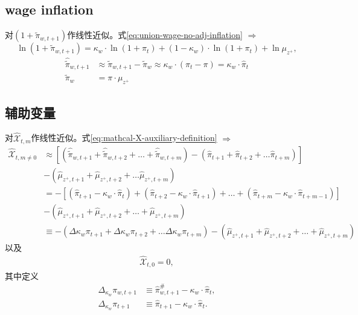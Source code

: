 \subsection{wage inflation}
\label{sec:union-wage-PC-wage-inflation}
对$\left( 1+\tilde{\pi}_{w,t+1} \right)$作线性近似。式\eqref{eq:union-wage-no-adj-inflation} $\Rightarrow$
\begin{equation*}
\ln (1+\tilde{\pi}_{w,t+1}) = \kappa_w \cdot \ln (1+\pi_t) + (1-\kappa_w) \cdot \ln (1+\pi_t) + \ln \mu_{z^+},
\end{equation*}
\begin{align}
\label{eq:union-max-wage-PC-lin-wage-inflation}
\hat{\tilde{\pi}}_{w,t+1} &\approx \tilde{\pi}_{w,t+1} - \tilde{\pi}_{w} \approx \kappa_w \cdot (\pi_t - \pi) = \kappa_w \cdot \hat{\pi}_t \\
\label{eq:union-max-wage-PC-ss-wage-inflation-pi-z}
\tilde{\pi}_{w} &= \pi \cdot \mu_{z^+}
\end{align}

\subsection{辅助变量}
\label{sec:union-wage-PC-wage-auxliary}
对$\hat{\mathcal{X}}_{t,m}$作线性近似。式\eqref{eq:mathcal-X-auxiliary-definition} $\Rightarrow$
\begin{align}
\label{eq:union-max-wage-PC-Xtm-n0}
\hat{\mathcal{X}}_{t,m \neq 0} &\approx   \left[\left(
  \hat{\tilde{\pi}}_{w,t+1} + \hat{\tilde{\pi}}_{w,t+2} + \ldots +\hat{\tilde{\pi}}_{w,t+m}
  \right) - \left(
  \hat{\pi}_{t+1} + \hat{\pi}_{t+2} + \ldots \hat{\pi}_{t+m}
  \right)\right] \nonumber \\
  &-\left(
  \hat{\mu}_{z^+,t+1} + \hat{\mu}_{z^+,t+2} + \ldots \hat{\mu}_{z^+,t+m}
  \right) \nonumber \\
  &= -\left[
  \left(\hat{\pi}_{t+1} - \kappa_w \cdot \hat{\pi}_{t}\right) +
  \left(\hat{\pi}_{t+2} - \kappa_w \cdot \hat{\pi}_{t+1}\right) +
  \ldots +
  \left(\hat{\pi}_{t+m} - \kappa_w \cdot \hat{\pi}_{t+m-1}\right)
  \right] \nonumber \\
  &-\left(
  \hat{\mu}_{z^+,t+1} + \hat{\mu}_{z^+,t+2} +\ldots + \hat{\mu}_{z^+,t+m}
  \right) \nonumber \\
  &\equiv - \left(\Delta \kappa_w \pi_{t+1} + \Delta \kappa_w \pi_{t+2} + \ldots \Delta \kappa_w \pi_{t+m}\right)-\left(
  \hat{\mu}_{z^+,t+1} + \hat{\mu}_{z^+,t+2} + \ldots + \hat{\mu}_{z^+,t+m}
  \right)
\end{align}
以及
\begin{align}
\label{eq:union-max-wage-PC-Xtm-0}
\hat{\mathcal{X}}_{t,0} = 0,
\end{align}
其中定义
\begin{align}
\label{def-kappa-Delta-pi-w}
\Delta_{\kappa_w} \pi_{w,t+1} &\equiv \hat{\pi}^{\#}_{w,t+1} - \kappa_w \cdot \hat{\pi}_t, \\
\label{def-kappa-Delta-pi}
\Delta_{\kappa_w} \pi_{t+1} &\equiv \hat{\pi}_{t+1} - \kappa_w \cdot \hat{\pi}_t.
\end{align}

